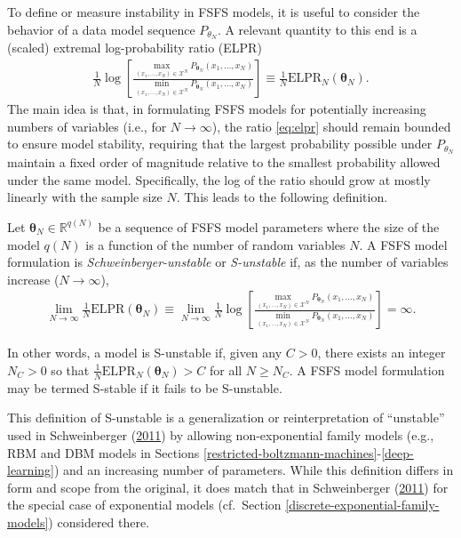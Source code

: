 \documentclass[12pt]{article}
\theoremstyle{definition}
\let\BeginKnitrBlock\begin \let\EndKnitrBlock\end
\begin{document}
To define or measure instability in FSFS models, it is useful to
consider the behavior of a data model sequence \(P_{\theta_N}\). A
relevant quantity to this end is a (scaled) extremal log-probability
ratio (ELPR)
\begin{align}
\frac{1}{N} \log \left[\frac{\max\limits_{(x_1, \dots, x_N) \in \mathcal{X}^N}P_{\boldsymbol \theta_N}(x_1, \dots, x_N)}{\min\limits_{(x_1, \dots, x_N) \in \mathcal{X}^N}P_{\boldsymbol \theta_N}(x_1, \dots, x_N)}\right] \equiv \frac{1}{N} \text{ELPR}_N(\boldsymbol \theta_N). \label{eq:elpr}
\end{align}
The main idea is that, in formulating FSFS models for potentially
increasing numbers of variables (i.e., for \(N \rightarrow \infty\)),
the ratio \eqref{eq:elpr} should remain bounded to ensure model stability,
requiring that the largest probability possible under \(P_{\theta_N}\)
maintain a fixed order of magnitude relative to the smallest probability
allowed under the same model. Specifically, the log of the ratio should
grow at mostly linearly with the sample size \(N\). This leads to the
following definition.
\BeginKnitrBlock{definition}[S-unstable FSFS]
\protect\hypertarget{def:instabFSFS}{}{\label{def:instabFSFS}
\iffalse (S-unstable FSFS) \fi{} }Let
\(\boldsymbol \theta_N \in \mathbb{R}^{q(N)}\) be a sequence of FSFS
model parameters where the size of the model \(q(N)\) is a function of
the number of random variables \(N\). A FSFS model formulation is
\emph{Schweinberger-unstable} or \emph{S-unstable} if, as the number of
variables increase (\(N \rightarrow \infty\)),
\begin{align*}
\lim\limits_{N \rightarrow \infty} \frac{1}{N} \text{ELPR}(\boldsymbol \theta_N) \equiv \lim\limits_{N \rightarrow \infty} \frac{1}{N} \log \left[\frac{\max\limits_{(x_1, \dots, x_N) \in \mathcal{X}^N}P_{\boldsymbol \theta_N}(x_1, \dots, x_N)}{\min\limits_{(x_1, \dots, x_N) \in \mathcal{X}^N}P_{\boldsymbol \theta_N}(x_1, \dots, x_N)}\right] = \infty.
\end{align*}
\EndKnitrBlock{definition} In other words, a model is S-unstable if,
given any \(C > 0\), there exists an integer \(N_C > 0\) so that
\(\frac{1}{N}\text{ELPR}_N(\boldsymbol \theta_N) > C\) for all
\(N \ge N_C\). A FSFS model formulation may be termed S-stable if it
fails to be S-unstable.

This definition of S-unstable is a generalization or reinterpretation of
``unstable'' used in Schweinberger
(\protect\hyperlink{ref-schweinberger2011instability}{2011}) by allowing
non-exponential family models (e.g., RBM and DBM models in Sections
\ref{restricted-boltzmann-machines}-\ref{deep-learning}) and an
increasing number of parameters. While this definition differs in form
and scope from the original, it does match that in Schweinberger
(\protect\hyperlink{ref-schweinberger2011instability}{2011}) for the
special case of exponential models (cf.~Section
\ref{discrete-exponential-family-models}) considered there.
\end{document}
